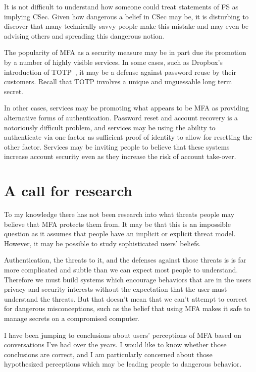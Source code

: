 \documentclass{soups}
\newcommand{\prop}[1]{\textsf{#1}}
\begin{document}
It is not difficult to understand how someone could treat statements of  \prop{FS} as implying  \prop{CSec}.
Given how dangerous a belief in  \prop{CSec} may be, it is disturbing to discover that
many technically savvy people make this mistake and may even be advising others and spreading this dangerous notion.

The popularity of MFA as a security measure may be in part due its promotion by a number of highly visible services.
In some cases,
such as Dropbox's introduction of TOTP~\autocite{Dropbox12:reuse},
it may be a defense against password reuse by their customers.
Recall that TOTP involves a unique and unguessable long term secret.

In other cases, services may be promoting what appears to be MFA as providing
alternative forms of authentication. 
Password reset and account recovery is a notoriously difficult problem,
and services may be using the ability to authenticate via one factor
as sufficient proof of identity to allow for resetting the other factor.
Services may be inviting people to believe that these systems increase account security
even as they increase the risk of account take-over.

\section{A call for research}

To my knowledge there has not been research into what threats people may
believe that MFA protects them from.
It may be that this is an impossible question as it assumes that people
have an implicit or explicit threat model.
However, it may be possible to study sophisticated users' beliefs.

Authentication, the threats to it, and the defenses against those threats is 
is far more complicated and subtle than we can expect most people to understand.
Therefore we must build systems which encourage behaviors that are in the users
privacy and security interests without the expectation that the user must understand the threats.
But that doesn't mean that we can't attempt to correct for dangerous misconceptions,
such as the belief that using MFA makes it safe to manage secrets on a compromised computer.

I have been jumping to conclusions about users' perceptions of MFA based on 
conversations I've had over the years.
I would like to know whether those conclusions are correct,
and I am particularly concerned about those hypothesized perceptions which may be leading
people to dangerous behavior.

%
%
\printbibliography[title={REFERENCES},heading=bibnumbered]
\end{document}
